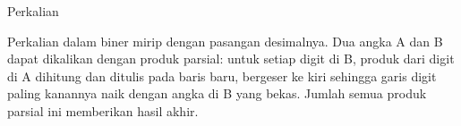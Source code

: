 Perkalian

Perkalian dalam biner mirip dengan pasangan desimalnya. Dua angka A dan B dapat dikalikan dengan produk parsial: untuk setiap digit di B, produk dari digit di A dihitung dan ditulis pada baris baru, bergeser ke kiri sehingga garis digit paling kanannya naik dengan angka di B yang bekas. Jumlah semua produk parsial ini memberikan hasil akhir.